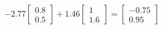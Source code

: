 \documentclass[preview]{standalone}
\begin{document}
\begin{align*}
-2.77 \begin{bmatrix} 0.8 \\ 0.5 \end{bmatrix} + 1.46 \begin{bmatrix} 1 \\ 1.6 \end{bmatrix} = \begin{bmatrix} -0.75 \\ 0.95 \end{bmatrix}
\end{align*}
\end{document}
